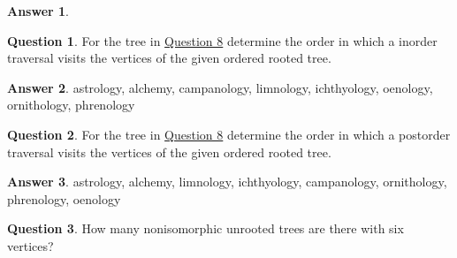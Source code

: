 \documentclass[article, 12pt]{article}
\theoremstyle{definition}
\newtheorem{question}{Question}
\newtheorem{answer}{Answer}
\begin{document}
    \begin{answer} \
        \label{a8}
        \begin{figure}[H]
            \centering
        \end{figure}
    \end{answer}

    \begin{question}
        \label{q9}
        For the tree in \hyperref[a8]{Question 8} determine the order in which a inorder traversal visits the vertices of the given ordered rooted tree.    
    \end{question}

    \begin{answer}
        \label{a9}
        astrology, alchemy, campanology, limnology, ichthyology, oenology, ornithology, phrenology
    \end{answer}

    \begin{question}
        \label{q10}
        For the tree in \hyperref[a8]{Question 8} determine the order in which a postorder traversal visits the vertices of the given ordered rooted tree.
    \end{question}

    \begin{answer}
        \label{a10}
        astrology, alchemy, limnology, ichthyology, campanology, ornithology, phrenology, oenology
    \end{answer}

    \begin{question}
        \label{q11}
        How many nonisomorphic unrooted trees are there with six vertices?
    \end{question}
\end{document}

